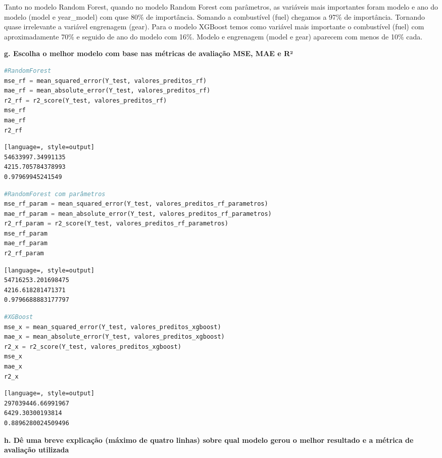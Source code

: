 Tanto no modelo Random Forest, quando no modelo Random Forest com parâmetros, as variáveis mais importantes foram modelo e ano do modelo (model e year\_model) com quse 80\% de importância. Somando a combustível (fuel) chegamos a 97\% de importância. Tornando quase irrelevante a variável engrenagem (gear). Para o modelo XGBoost temos como variável mais importante o combustível (fuel) com aproximadamente 70\% e seguido de ano do modelo com 16\%. Modelo e engrenagem (model e gear) aparecem com menos de 10\% cada.

\begin{adjustwidth}{1em}{}
\textbf{g. Escolha o melhor modelo com base nas métricas de avaliação MSE, MAE e R²}
\end{adjustwidth}
\begin{lstlisting}[language=Python, style=input]
#RandomForest
mse_rf = mean_squared_error(Y_test, valores_preditos_rf)
mae_rf = mean_absolute_error(Y_test, valores_preditos_rf)
r2_rf = r2_score(Y_test, valores_preditos_rf)
mse_rf
mae_rf
r2_rf
\end{lstlisting}
\begin{lstlisting}[language=, style=output]
54633997.34991135
4215.705784378993
0.97969945241549
\end{lstlisting}


\begin{lstlisting}[language=Python, style=input]
#RandomForest com parâmetros
mse_rf_param = mean_squared_error(Y_test, valores_preditos_rf_parametros)
mae_rf_param = mean_absolute_error(Y_test, valores_preditos_rf_parametros)
r2_rf_param = r2_score(Y_test, valores_preditos_rf_parametros)
mse_rf_param
mae_rf_param
r2_rf_param
\end{lstlisting}
\begin{lstlisting}[language=, style=output]
54716253.201698475
4216.618281471371
0.9796688883177797
\end{lstlisting}


\begin{lstlisting}[language=Python, style=input]
#XGBoost
mse_x = mean_squared_error(Y_test, valores_preditos_xgboost)
mae_x = mean_absolute_error(Y_test, valores_preditos_xgboost)
r2_x = r2_score(Y_test, valores_preditos_xgboost)
mse_x
mae_x
r2_x
\end{lstlisting}
\begin{lstlisting}[language=, style=output]
297039446.66991967
6429.30300193814
0.8896280024509496
\end{lstlisting}

\begin{adjustwidth}{1em}{}
\textbf{h. Dê uma breve explicação (máximo de quatro linhas) sobre qual modelo gerou o melhor resultado e a métrica de
avaliação utilizada}
\end{adjustwidth}

